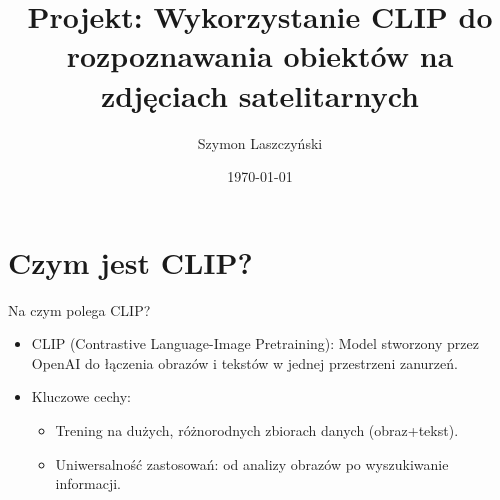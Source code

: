 \documentclass{beamer}
\title{Projekt: Wykorzystanie CLIP do rozpoznawania obiektów na zdjęciach satelitarnych}
\author{Szymon Laszczyński}
\date{\today}
\begin{document}
\frame{\titlepage}

\section{Czym jest CLIP?}
\begin{frame}{Na czym polega CLIP?}
  \begin{itemize}
    \item CLIP (Contrastive Language-Image Pretraining): Model stworzony przez OpenAI do łączenia obrazów i tekstów w jednej przestrzeni zanurzeń.
    \item Kluczowe cechy:
      \begin{itemize}
        \item Trening na dużych, różnorodnych zbiorach danych (obraz+tekst).
        \item Uniwersalność zastosowań: od analizy obrazów po wyszukiwanie informacji.
      \end{itemize}
  \end{itemize}
\end{frame}
\end{document}
